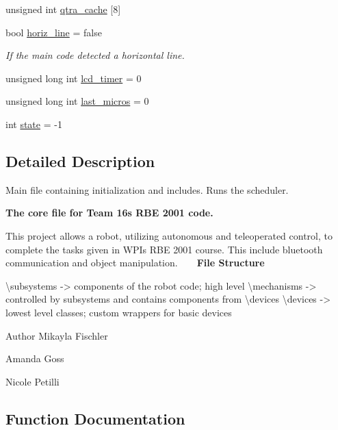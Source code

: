 \begin{DoxyCompactItemize}
\item 
unsigned int \hyperlink{rbe2001_8ino_a2150bcc72eebb9bb31ae6556b4361ebf}{qtra\+\_\+cache} \mbox{[}8\mbox{]}
\item 
bool \hyperlink{rbe2001_8ino_a90bb1c48eba85e2acf136982fcfd628e}{horiz\+\_\+line} = false
\begin{DoxyCompactList}\small\item\em If the main code detected a horizontal line. \end{DoxyCompactList}\item 
unsigned long int \hyperlink{rbe2001_8ino_afa841889ef06f65dcaf6465eb3df75a1}{lcd\+\_\+timer} = 0
\item 
unsigned long int \hyperlink{rbe2001_8ino_aa06e377d25b7ca134c27aea3e6c46235}{last\+\_\+micros} = 0
\item 
int \hyperlink{rbe2001_8ino_a89f234133d3efe315836311cbf21c64b}{state} = -\/1
\end{DoxyCompactItemize}


\subsection{Detailed Description}
Main file containing initialization and includes. Runs the scheduler. 

{\bfseries The core file for Team 16\textquotesingle{}s R\+BE 2001 code.}

This project allows a robot, utilizing autonomous and teleoperated control, to complete the tasks given in W\+PI\textquotesingle{}s R\+BE 2001 course. This include bluetooth communication and object manipulation. ~\newline
~\newline
 {\bfseries File Structure} 
\begin{DoxyPre}
    \textbackslash{}subsystems
        -> components of the robot code; high level
    \textbackslash{}mechanisms
        -> controlled by subsystems and contains components from \textbackslash{}devices
    \textbackslash{}devices
        -> lowest level classes; custom wrappers for basic devices
    \end{DoxyPre}


\begin{DoxyAuthor}{Author}
Mikayla Fischler 

Amanda Goss 

Nicole Petilli 
\end{DoxyAuthor}


\subsection{Function Documentation}
\mbox{\label{rbe2001_8ino_a4cbb289153633c01a1584b3aa0d9a0a2}} 
